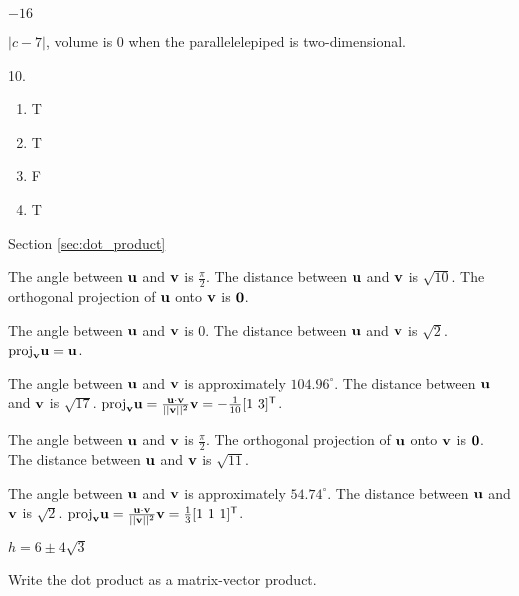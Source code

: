 \begin{multicols}{2}
\item $-16$

\ea

\item $|c-7|$, volume is $0$ when the parallelelepiped is two-dimensional. 

\oee

\be
\item[10.]
\begin{enumerate}[label=(\alph*), leftmargin=1\parindent]
\item T
\item T
\item F
\item T

\end{enumerate}

\ee


\hspace{-0.25in} Section \ref{sec:dot_product}
\obe
\item 
\ba
\item The angle between $\mathbf{u}$ and $\mathbf{v}$ is $\frac{\pi}{2}$. The distance between $\mathbf{u}$ and $\mathbf{v}$ is $\sqrt{10}$. The orthogonal projection of $\mathbf{u}$ onto $\mathbf{v}$ is $\mathbf{0}$.

\item The angle between $\mathbf{u}$ and $\mathbf{v}$ is $0$. The distance between $\mathbf{u}$ and $\mathbf{v}$ is $\sqrt{2}$. $\text{proj}_{\mathbf{v}} \mathbf{u} = \mathbf{u}$. 

\item The angle between $\mathbf{u}$ and $\mathbf{v}$ is approximately $104.96^{\circ}$. The distance between $\mathbf{u}$ and $\mathbf{v}$ is $\sqrt{17}$. $\text{proj}_{\mathbf{v}} \mathbf{u} = \frac{\mathbf{u} \cdot \mathbf{v}}{||\mathbf{v}||^2} \mathbf{v} = -\frac{1}{10}[1 \ 3]^{\mathsf{T}}$.

\item The angle between $\mathbf{u}$ and $\mathbf{v}$ is $\frac{\pi}{2}$. The orthogonal projection of $\mathbf{u}$ onto $\mathbf{v}$ is $\mathbf{0}$. The distance between $\mathbf{u}$ and $\mathbf{v}$ is $\sqrt{11}$.

\item The angle between $\mathbf{u}$ and $\mathbf{v}$ is approximately $54.74^{\circ}$.
The distance between $\mathbf{u}$ and $\mathbf{v}$ is $\sqrt{2}$. $\text{proj}_{\mathbf{v}} \mathbf{u} = \frac{\mathbf{u} \cdot \mathbf{v}}{||\mathbf{v}||^2} \mathbf{v} = \frac{1}{3}[1 \ 1 \ 1]^{\mathsf{T}}$. 

\ea

\item $h = 6 \pm 4\sqrt{3}$ 

\item Write the dot product as a matrix-vector product. 


\end{multicols}
